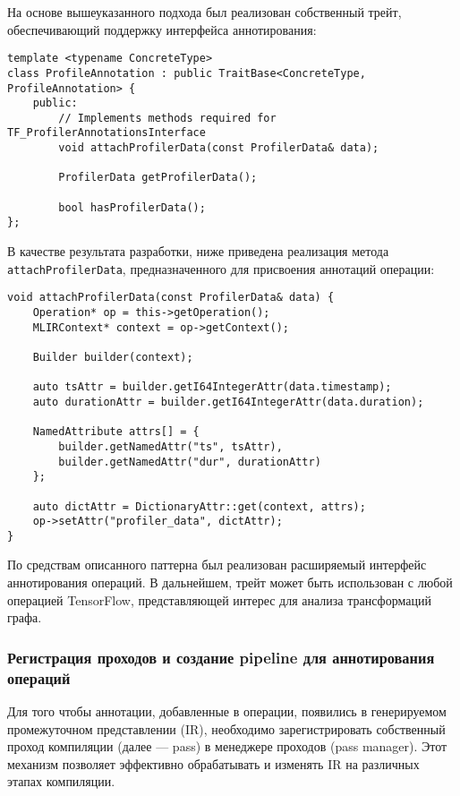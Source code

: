 На основе вышеуказанного подхода был реализован собственный трейт, обеспечивающий поддержку интерфейса аннотирования:

\begin{lstlisting}[caption={Трейт аннотирования операций MLIR}]
template <typename ConcreteType>
class ProfileAnnotation : public TraitBase<ConcreteType, ProfileAnnotation> {
    public:
        // Implements methods required for TF_ProfilerAnnotationsInterface
        void attachProfilerData(const ProfilerData& data);

        ProfilerData getProfilerData();

        bool hasProfilerData();
};
\end{lstlisting}

В качестве результата разработки, ниже приведена реализация метода \texttt{attachProfilerData}, предназначенного для присвоения аннотаций операции:

\begin{lstlisting}[caption={Реализация метода attachProfilerData}]
void attachProfilerData(const ProfilerData& data) {
    Operation* op = this->getOperation();
    MLIRContext* context = op->getContext();

    Builder builder(context);

    auto tsAttr = builder.getI64IntegerAttr(data.timestamp);
    auto durationAttr = builder.getI64IntegerAttr(data.duration);

    NamedAttribute attrs[] = {
        builder.getNamedAttr("ts", tsAttr),
        builder.getNamedAttr("dur", durationAttr)
    };

    auto dictAttr = DictionaryAttr::get(context, attrs);
    op->setAttr("profiler_data", dictAttr);
}
\end{lstlisting}

По средствам описанного паттерна был реализован расширяемый интерфейс аннотирования операций.
В дальнейшем, трейт может быть использован с любой операцией TensorFlow, представляющей интерес для анализа трансформаций графа.

\subsubsection{Регистрация проходов и создание pipeline для аннотирования операций}

Для того чтобы аннотации, добавленные в операции, появились в генерируемом промежуточном представлении (IR), необходимо зарегистрировать собственный проход компиляции (далее — pass) в менеджере проходов (pass manager).
Этот механизм позволяет эффективно обрабатывать и изменять IR на различных этапах компиляции.

